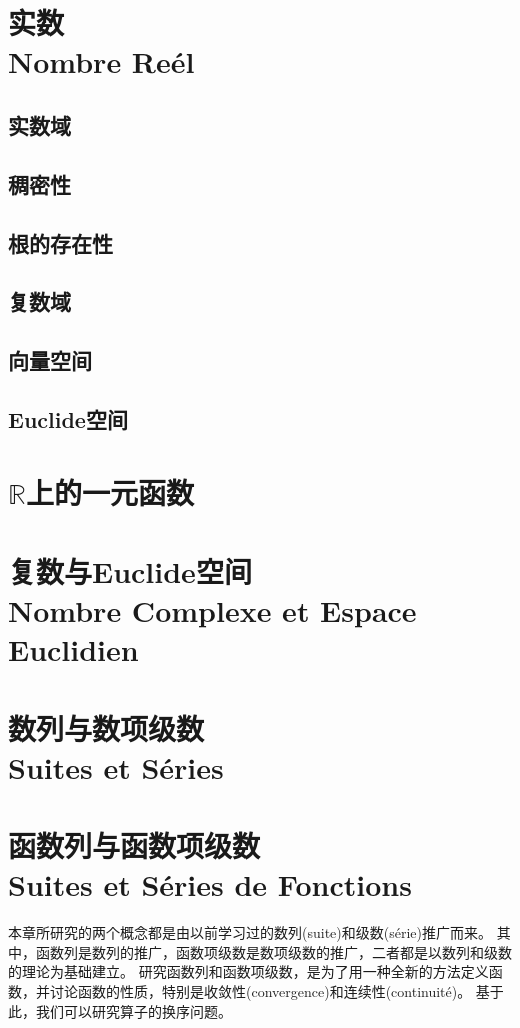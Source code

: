 \documentclass[12pt, a4paper, oneside]{ctexbook}
\begin{document}
\chapter{实数\\ Nombre Reél}%
  \section{实数域}
  \section{稠密性}
  \section{根的存在性}
  \section{复数域}
  \section{向量空间}
  \section{Euclide空间}
\chapter{$\mathbb{R}$上的一元函数}
\chapter{复数与Euclide空间\\Nombre Complexe et Espace Euclidien}%

\chapter{数列与数项级数\\Suites et Séries}


\chapter{函数列与函数项级数\\Suites et Séries de Fonctions}
  本章所研究的两个概念都是由以前学习过的数列(suite)和级数(série)推广而来。
  其中，函数列是数列的推广，函数项级数是数项级数的推广，二者都是以数列和级数的理论为基础建立。
  研究函数列和函数项级数，是为了用一种全新的方法定义函数，并讨论函数的性质，特别是收敛性(convergence)和连续性(continuité)。
  基于此，我们可以研究算子的换序问题。
\end{document}
